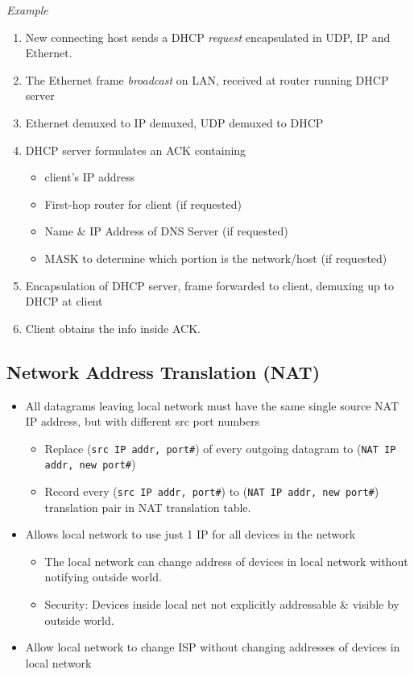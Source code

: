 \documentclass[a4paper]{article}
\begin{document}
\bigskip

\noindent\textit{Example}
\begin{enumerate}
    \item New connecting host sends a DHCP \textit{request} encapsulated in UDP, IP and Ethernet.
    \item The Ethernet frame \textit{broadcast} on LAN, received at router running DHCP server
    \item Ethernet demuxed to IP demuxed, UDP demuxed to DHCP
    \item DHCP server formulates an ACK containing
    \begin{itemize}[label=$\circ$]
        \item client's IP address
        \item First-hop router for client (if requested)
        \item Name \& IP Address of DNS Server (if requested)
        \item MASK to determine which portion is the network/host (if requested)
    \end{itemize}
    \item Encapsulation of DHCP server, frame forwarded to client, demuxing up to DHCP at client
    \item Client obtains the info inside ACK.
\end{enumerate}

\newpage
\subsection{Network Address Translation (NAT)}
\begin{itemize}
    \item All datagrams leaving local network must have the same single source NAT IP address, but with different src port numbers
    \begin{itemize}[label=$\circ$]
        \item Replace (\texttt{src IP addr, port\#}) of every outgoing datagram to (\texttt{NAT IP addr, new port\#})
        \item Record every (\texttt{src IP addr, port\#}) to (\texttt{NAT IP addr, new port\#}) translation pair in NAT translation table.
    \end{itemize}
    \item Allows local network to use just 1 IP for all devices in the network
    \begin{itemize}[label=$\circ$]
        \item The local network can change address of devices in local network without notifying outside world.
        \item Security: Devices inside local net not explicitly addressable \& visible by outside world.
    \end{itemize}
    \item Allow local network to change ISP without changing addresses of devices in local network
\end{itemize}
\end{document}
